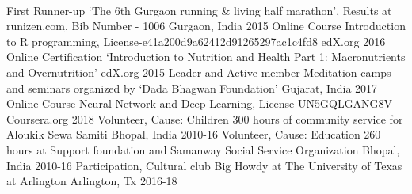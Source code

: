 \cvsubsection{}
\begin{cvhonors}
\\  
  \cvhonor
    {First Runner-up} %
    {`The 6th Gurgaon running \& living half marathon',  Results at {runizen.com}\href{runizen.com}, Bib Number - 1006} %
    {Gurgaon, India} %
    {2015} %
  \cvhonor
    {Online Course} %
    {Introduction to R programming, License-e41a200d9a62412d91265297ac1c4fd8} %
    {edX.org} %
    {2016} %
  \cvhonor
    {Online Certification} %
    {‘Introduction to Nutrition and Health Part 1: Macronutrients and
Overnutrition’} %
    {edX.org} %
    {2015} %
  \cvhonor
    {Leader and Active member} %
    {Meditation camps and seminars organized by ‘Dada Bhagwan Foundation’} %
    {Gujarat, India} %
    {2017} %
  \cvhonor
    {Online Course} %
    {Neural Network and Deep Learning, License-UN5GQLGANG8V} %
    {Coursera.org} %
    {2018} %
	\cvhonor
	{Volunteer, Cause: Children}
	{300 hours of community service for Aloukik Sewa Samiti}
    {Bhopal, India}
    {2010-16}
	\cvhonor
	{Volunteer, Cause: Education}
	{260 hours at Support foundation and Samanway Social Service Organization}
    {Bhopal, India}
    {2010-16}
    \cvhonor
    {Participation, Cultural club}
    {Big Howdy at The University of Texas at Arlington}
    {Arlington, Tx}
    {2016-18}
\end{cvhonors}
